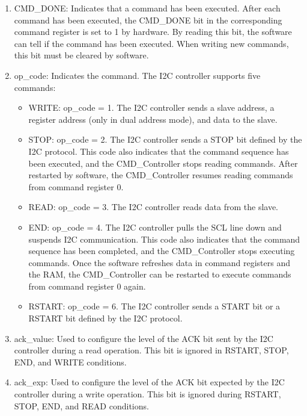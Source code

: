 \documentclass[main\_\_EN.tex]{subfiles}
\begin{document}
\begin{enumerate}

\item CMD\_DONE: Indicates that a command has been executed. After each command has been executed, the CMD\_DONE bit in the corresponding command register is set to 1 by hardware. By reading this bit, the software can tell if the command has been executed. When writing new commands, this bit must be cleared by software.

\item op\_code: Indicates the command. The I2C controller supports five commands:

\begin{itemize}

    \item WRITE: op\_code = 1. The I2C controller sends a slave address, a register address  (only in dual address mode), and data to the slave.

    \item STOP: op\_code = 2. The I2C controller sends a STOP bit defined by the I2C protocol. This code also indicates that the command sequence has been executed, and the CMD\_Controller stops reading commands. After restarted by software, the CMD\_Controller resumes reading commands from command register 0.

    \item READ: op\_code = 3. The I2C controller reads data from the slave.

    \item END: op\_code = 4. The I2C controller pulls the SCL line down and suspends I2C communication. This code also indicates that the command sequence has been completed, and the CMD\_Controller stops executing commands. Once the software refreshes data in command registers and the RAM, the CMD\_Controller can be restarted to execute commands from command register 0 again.

    \item RSTART: op\_code = 6. The I2C controller sends a START bit or a RSTART bit defined by the I2C protocol.

\end{itemize}

\item ack\_value: Used to configure the level of the ACK bit sent by the I2C controller during a read operation. This bit is ignored in RSTART, STOP, END, and WRITE conditions.

\item ack\_exp: Used to configure the level of the ACK bit expected by the I2C controller during a write operation. This bit is ignored during RSTART, STOP, END, and READ conditions.


\end{enumerate}
\end{document}
